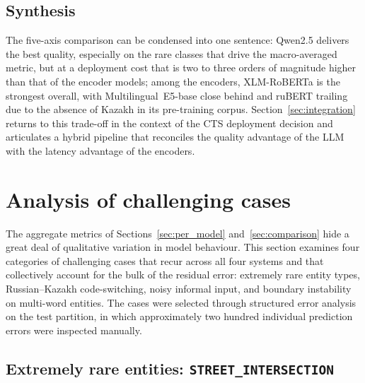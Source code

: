 \subsection{Synthesis}
\label{sec:cross_model_synthesis}

The five-axis comparison can be condensed into one sentence: Qwen2.5 delivers the best quality, especially on the rare classes that drive the macro-averaged metric, but at a deployment cost that is two to three orders of magnitude higher than that of the encoder models; among the encoders, XLM-RoBERTa is the strongest overall, with Multilingual~E5-base close behind and ruBERT trailing due to the absence of Kazakh in its pre-training corpus. Section~\ref{sec:integration} returns to this trade-off in the context of the CTS deployment decision and articulates a hybrid pipeline that reconciles the quality advantage of the LLM with the latency advantage of the encoders.


\section{Analysis of challenging cases}
\label{sec:hard_cases}

The aggregate metrics of Sections~\ref{sec:per_model} and~\ref{sec:comparison} hide a great deal of qualitative variation in model behaviour. This section examines four categories of challenging cases that recur across all four systems and that collectively account for the bulk of the residual error: extremely rare entity types, Russian--Kazakh code-switching, noisy informal input, and boundary instability on multi-word entities. The cases were selected through structured error analysis on the test partition, in which approximately two hundred individual prediction errors were inspected manually.

\subsection{Extremely rare entities: \texttt{STREET\_INTERSECTION}}
\label{sec:hard_intersection}

